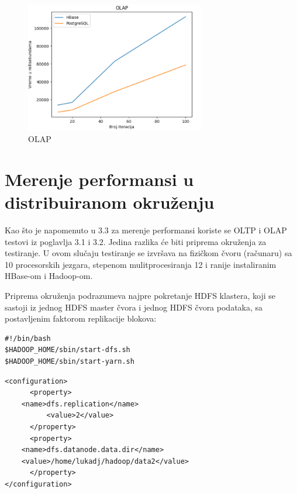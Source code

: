 \documentclass[12pt,oneside]{memoir}
\begin{document}
\begin{figure}[!ht]
  \centering
  \includegraphics[width=0.7\textwidth]{olap-vizualization2.png}
  \caption{OLAP}
  \label{fig:grafikon}
\end{figure}



\section{Merenje performansi u distribuiranom okruženju}

Kao što je napomenuto u 3.3 za merenje performansi koriste se OLTP i OLAP testovi iz poglavlja 3.1 i 3.2. Jedina razlika će biti priprema okruženja za testiranje. 
U ovom slučaju testiranje se izvršava na fizičkom čvoru (računaru) sa 10 procesorskih jezgara, stepenom mulitprocesiranja 12 i ranije instaliranim HBase-om i Hadoop-om. 

Priprema okruženja podrazumeva najpre pokretanje HDFS klastera, koji se sastoji iz jednog HDFS master čvora i jednog HDFS čvora podataka, sa postavljenim faktorom replikacije blokova:

\begin{lstlisting}[title={start-hadoop.sh - Komande za pokretanje HDFS komponenti},captionpos=b]
#!/bin/bash
$HADOOP_HOME/sbin/start-dfs.sh
$HADOOP_HOME/sbin/start-yarn.sh
\end{lstlisting}

\begin{lstlisting}[title={hdfs-site.xml - Konfiguracija HDFS-a sa faktorom replikacije 2},captionpos=b]
<configuration>
      <property>
	<name>dfs.replication</name>
          <value>2</value>
      </property>
      <property>
  	<name>dfs.datanode.data.dir</name>
  	<value>/home/lukadj/hadoop/data2</value>
      </property>
</configuration>
\end{lstlisting}
\end{document}
